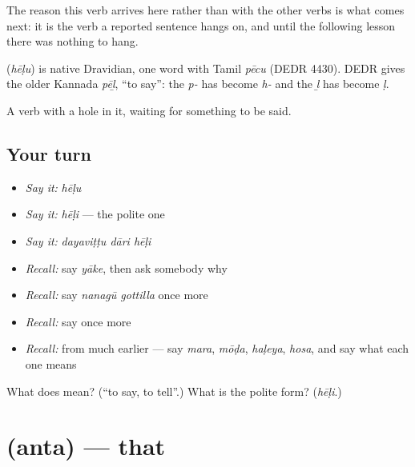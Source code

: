 The reason this verb arrives here rather than with the other verbs is what comes next: it is the verb a reported sentence hangs on, and until the following lesson there was nothing to hang.

\begin{cousinweb}
\textbf{} (\emph{hēḷu}) is native Dravidian, one word with Tamil \emph{pēcu} (DEDR 4430). DEDR gives the older Kannada \emph{pēḻ}, \textquotedblleft{}to say\textquotedblright{}: the \emph{p-} has become \emph{h-} and the \emph{ḻ} has become \emph{ḷ}.
\end{cousinweb}

\begin{grammarlens}[title={What you've built}]
A verb with a hole in it, waiting for something to be said.
\end{grammarlens}

\subsection*{Your turn}
\begin{itemize}
\raggedright
  \item \emph{Say it:} \emph{hēḷu}
  \item \emph{Say it:} \emph{hēḷi} — the polite one
  \item \emph{Say it:} \emph{dayaviṭṭu dāri hēḷi}
  \item \emph{Recall:} say \emph{yāke}, then ask somebody why
  \item \emph{Recall:} say \emph{nanagū gottilla} once more
  \item \emph{Recall:} say \emph{} once more
  \item \emph{Recall:} from much earlier — say \emph{mara}, \emph{mōḍa}, \emph{haḷeya}, \emph{hosa}, and say what each one means
\end{itemize}

\begin{tcolorbox}[breakable,colback=teal!4,colframe=teal!35!black,title={Before you move on}]
What does  mean? (\textquotedblleft{}to say, to tell\textquotedblright{}.) What is the polite form? (\emph{hēḷi}.)
\end{tcolorbox}
\section[\texorpdfstring{\kn{ಅಂತ} (anta)}{ಅಂತ (anta)}]{ (anta) — that}

\label{lesson:KA-C70-quotative}



